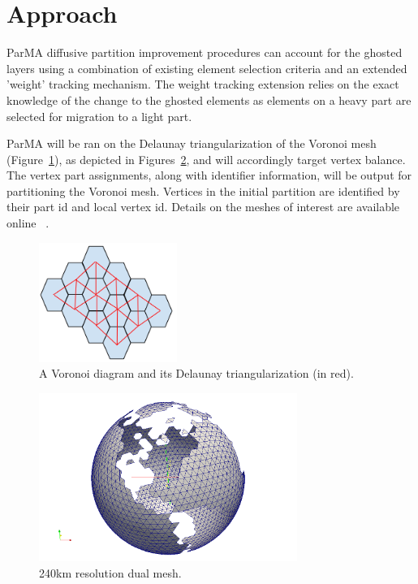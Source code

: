 \documentclass[a4paper]{article}
\begin{document}
\section{Approach}

ParMA diffusive partition improvement procedures can account for the ghosted
layers using a combination of existing element selection criteria and an
extended 'weight' tracking mechanism.
The weight tracking extension relies on the exact knowledge of the change to the
ghosted elements as elements on a heavy part are selected for migration to a
light part.

ParMA will be ran on the Delaunay triangularization of the Voronoi mesh
(Figure~\ref{fig:delaunay}), as depicted in Figures~\ref{fig:NA240}, and will
accordingly target vertex balance.
The vertex part assignments, along with identifier information, will be output
for partitioning the Voronoi mesh.
Vertices in the initial partition are identified by their part id and local
vertex id.
Details on the meshes of interest are available online ~\cite{climateMesh}.

\begin{figure}
\centering
\includegraphics[width=0.4\textwidth]{ghostingOwnershipFig1.png}
\caption{\label{fig:delaunay} A Voronoi diagram and its Delaunay triangularization (in red).}
\end{figure}

\begin{figure}
\centering
\includegraphics[width=0.75\textwidth]{ocean_QU_240kmNA.png}
\caption{\label{fig:NA240} 240km resolution dual mesh.}
\end{figure}
\end{document}
